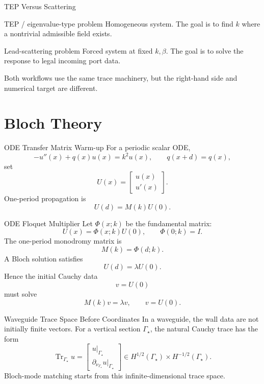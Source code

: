 \documentclass[aspectratio=169]{beamer}
\begin{document}
\begin{frame}{TEP Versus Scattering}
  \begin{block}{TEP / eigenvalue-type problem}
    Homogeneous system. The goal is to find \(k\) where a nontrivial admissible field exists.
  \end{block}
  \begin{block}{Lead-scattering problem}
    Forced system at fixed \(k,\beta\). The goal is to solve the response to legal incoming port data.
  \end{block}
  Both workflows use the same trace machinery, but the right-hand side and numerical target are different.
\end{frame}

\section{Bloch Theory}

\begin{frame}{ODE Transfer Matrix Warm-up}
  For a periodic scalar ODE,
  \[
    -u''(x)+q(x)u(x)=k^2u(x),
    \qquad q(x+d)=q(x),
  \]
  set
  \[
    U(x)=\begin{bmatrix}u(x)\\ u'(x)\end{bmatrix}.
  \]
  One-period propagation is
  \[
    U(d)=M(k)U(0).
  \]
\end{frame}

\begin{frame}{ODE Floquet Multiplier}
  Let \(\Phi(x;k)\) be the fundamental matrix:
  \[
    U(x)=\Phi(x;k)U(0),
    \qquad
    \Phi(0;k)=I.
  \]
  The one-period monodromy matrix is
  \[
    M(k)=\Phi(d;k).
  \]
  A Bloch solution satisfies
  \[
    U(d)=\lambda U(0).
  \]
  Hence the initial Cauchy data
  \[
    v=U(0)
  \]
  must solve
  \[
    M(k)v=\lambda v,
    \qquad
    v=U(0).
  \]
\end{frame}

\begin{frame}{Waveguide Trace Space Before Coordinates}
  In a waveguide, the wall data are not initially finite vectors.
  For a vertical section \(\Gamma_\star\), the natural Cauchy trace has the form
  \[
    \operatorname{Tr}_{\Gamma_\star}u
    =
    \begin{bmatrix}
      u|_{\Gamma_\star}\\
      \partial_{\nu_{\Gamma_\star}}u|_{\Gamma_\star}
    \end{bmatrix}
    \in
    H^{1/2}(\Gamma_\star)\times H^{-1/2}(\Gamma_\star).
  \]
  Bloch-mode matching starts from this infinite-dimensional trace space.
\end{frame}
\end{document}
